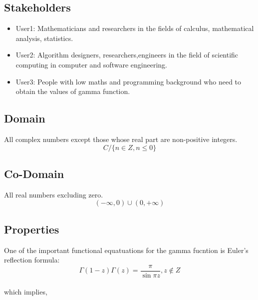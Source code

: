 \documentclass{report}
\begin{document}
\subsection{Stakeholders}
\begin{itemize}
\item User1: Mathematicians and researchers in the fields of calculus, mathematical analysis, statistics.
\item User2: Algorithm designers, researchers,engineers in the field of scientific computing in computer and software engineering.
\item User3: People with low maths and programming background who need to obtain the values of gamma function. 
\end{itemize}
\subsection{Domain}
All complex numbers except those whose real part are non-positive integers.
\\$$C/\{n\in Z, n\le 0\}$$
\subsection{Co-Domain}
All real numbers excluding zero.
\\$$\left ( -\infty,0  \right )\cup \left ( 0,+\infty  \right )$$
\subsection{Properties}
One of the important functional equatuations for the gamma fucntion is Euler's reflection formula:
\\$$\Gamma \left ( 1-z \right ) \Gamma \left ( z \right ) =\frac{\pi }{\sin \pi z},  z \notin Z $$ 
\\which implies,
\end{document}
